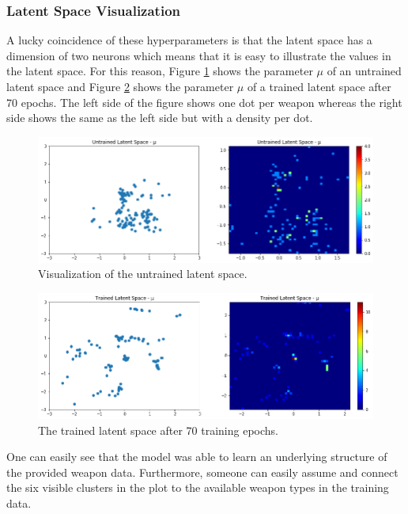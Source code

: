 \documentclass[MGS,Master,english]{twbook}%
\begin{document}
\subsubsection{Latent Space Visualization}
A lucky coincidence of these hyperparameters is that the latent space has a dimension of two neurons which means that it is easy to illustrate the values in the latent space. For this reason, Figure \ref{fig::vae::untrainedLatentSpace} shows the parameter $\mu$ of an untrained latent space and Figure \ref{fig::vae::trainedLatentSpace} shows the parameter $\mu$ of a trained latent space after 70 epochs. The left side of the figure shows one dot per weapon whereas the right side shows the same as the left side but with a density per dot.
\begin{figure}[!ht]
	\centering
	\includegraphics[width=1.0\linewidth]{PICs/trained_vae/untrained_latent_space}
	\caption{Visualization of the untrained latent space.} \label{fig::vae::untrainedLatentSpace}
\end{figure}
\begin{figure}[!ht]
	\centering
	\includegraphics[width=1.0\linewidth]{PICs/trained_vae/trained_latent_space}
	\caption{The trained latent space after 70 training epochs.} \label{fig::vae::trainedLatentSpace}
\end{figure}

One can easily see that the model was able to learn an underlying structure of the provided weapon data. Furthermore, someone can easily assume and connect the six visible clusters in the plot to the available weapon types in the training data.
\end{document}
